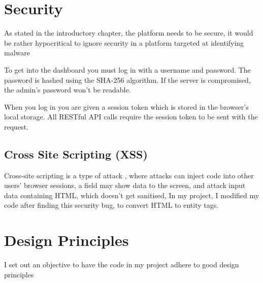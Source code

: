 \section{Security}
As stated in the introductory chapter, the platform needs to be secure,
it would be rather hypocritical to ignore security in a
platform targeted at identifying malware

To get into the dashboard you must log in with a username and password.
The password is hashed using the SHA-256 algorithm.
If the server is compromised, the admin's password won't be readable.

When you log in you are given a session token which is stored in the browser's local storage.
All RESTful API calls require the session token to be sent with the request.

\subsection{Cross Site Scripting (XSS)}
Cross-site scripting is a type of attack \cite{XSS},
where attacks can inject code into other users' browser sessions,
a field may show data to the screen, and attack input data containing HTML,
which doesn't get sanitised, In my project, I modified my code
after finding this security bug, to convert HTML to entity tags. 

\section {Design Principles}
I set out an objective to have the code in my project
adhere to good design principles

